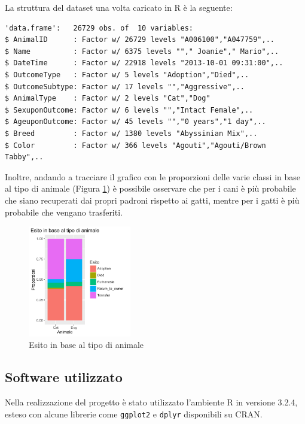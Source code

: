 La struttura del dataset una volta caricato in R è la seguente:

\begin{verbatim}
'data.frame':	26729 obs. of  10 variables:
$ AnimalID      : Factor w/ 26729 levels "A006100","A047759",..
$ Name          : Factor w/ 6375 levels ""," Joanie"," Mario",..
$ DateTime      : Factor w/ 22918 levels "2013-10-01 09:31:00",..
$ OutcomeType   : Factor w/ 5 levels "Adoption","Died",..
$ OutcomeSubtype: Factor w/ 17 levels "","Aggressive",..
$ AnimalType    : Factor w/ 2 levels "Cat","Dog"
$ SexuponOutcome: Factor w/ 6 levels "","Intact Female",..
$ AgeuponOutcome: Factor w/ 45 levels "","0 years","1 day",..
$ Breed         : Factor w/ 1380 levels "Abyssinian Mix",..
$ Color         : Factor w/ 366 levels "Agouti","Agouti/Brown Tabby",..
\end{verbatim}

Inoltre, andando a tracciare il grafico con le proporzioni delle varie classi in base al tipo di animale (Figura \ref{fig-animals}) è possibile osservare che per i cani è più probabile che siano recuperati dai propri padroni rispetto ai gatti, mentre per i gatti è più probabile che vengano trasferiti.

\begin{figure}[htbp]
	\centering
	\includegraphics[width=0.4\textwidth]{./grafici/esito_animal.pdf}
	\caption{Esito in base al tipo di animale}\label{fig-animals}
\end{figure}



\subsection{Software utilizzato}

Nella realizzazione del progetto è stato utilizzato l'ambiente R in versione 3.2.4, esteso con alcune librerie come \texttt{ggplot2} e \texttt{dplyr} disponibili su CRAN.




